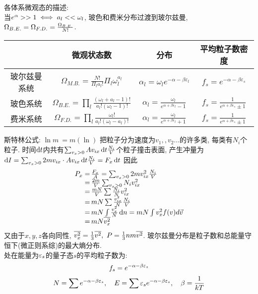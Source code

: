 \documentclass[UTF8,9pt]{ctexart}
\newcommand{\q}[1]{{\color{red} #1}}
\begin{document}
    各体系微观态的描述: \\
    当$e^\alpha>>1 \iff a_l<<\omega_l$, 玻色和费米分布过渡到玻尔兹曼, $\Omega_{B.E.}=\Omega_{F.D.}=\frac{\Omega_{B.E.}}{N!}$.
    \begin{table}[]
        \centering
        \begin{tabular}{|c|c|c|c|}
        \hline
               & 微观状态数                                                                                                     & 分布                                                                 & 平均粒子数密度                                                  \\ \hline
        玻尔兹曼系统 & $\Omega_{M . B .}=\frac{N !}{\Pi_{l} a_{l} !} \Pi_{l} \omega_{l}^{a_{l}}$                                 & $\alpha_{l}=\omega_{l} e^{-\alpha-\beta \varepsilon_{l}}$          & $f_{s}=e^{-\alpha-\beta \varepsilon_{s}}$                \\ \hline
        玻色系统   & $\Omega_{B . E .}=\prod_{l} \frac{\left(\omega_{l}+a_{l}-1\right) !}{a_{l} !\left(\omega_{l}-1\right) !}$ & $\alpha_{l}=\frac{\omega_{l}}{e^{\alpha+\beta \varepsilon_{l}}-1}$ & $f_{s}=\frac{1}{e^{\alpha+\beta \varepsilon_{s}} \pm 1}$ \\ \hline
        费米系统   & $\Omega_{F . D .}=\prod_{l} \frac{\omega_{l} !}{a_l!\left(\omega_{l}-a_{l}\right) !}$                   & $\alpha_{l}=\frac{\omega_{l}}{e^{\alpha+\beta \varepsilon_{l}}+1}$ & $f_{s}=\frac{1}{e^{\alpha+\beta \varepsilon_{s}} \pm 1}$ \\ \hline
        \end{tabular}
        \end{table}
    \q{斯特林公式}: $\ln m~ =m(\ln)$
    把粒子分为速度为$v_1,,v_2...$的许多类, 每类有$N_i$个粒子. 时间$\mathop{}\!\mathrm{d} t$内共有$\sum_{v_x>0} Av_{ix}\mathop{}\!\mathrm{d} t\frac{N_i}{V}$个粒子撞击表面, 产生冲量为$\mathop{}\!\mathrm{d} I=\sum_{v_x>0} 2mv_{ix} \cdot Av_{ix}\mathop{}\!\mathrm{d} t\frac{N_i}{V}=F_x\mathop{}\!\mathrm{d} t$
    因此
    $$\ar{
        P_x\x \f{F_x}{A}=\sum_{v_x>0} 2mv_{ix}^2\f{N_i}{V}\\
        \x \f{2m}{V}\sum_{v_x>0} N_iv_{ix}^2\\
        \x \f{mN}{V}\sum \f{N_i}{N}v_{ix}^2\\
        \x  mN\sum \f{v_{ix}^2}{N}\f{N_i}{V}\\
        \x mN\int \f{v_x^2}{N}\d n=mN\int v_x^2f(v)d\vec{v}\\
        \x mN\bar{v_x^2}
    }$$
    又由于$x,y,z$各向同性, $\bar{v_x^2}=\ff{3}\bar{v^2},\ P=\ff{3}nm\bar{v^2}$.
玻尔兹曼分布是粒子数和总能量守恒下(微正则系综)的最大熵分布.\\
处在能量为$\varepsilon_s$的量子态$s$的平均粒子数为:
$$f_s=e^{-\alpha-\beta\varepsilon_s}$$
$$N=\sum e^{-\alpha-\beta\varepsilon_s}, \quad E=\sum \varepsilon_s e^{-\alpha-\beta\varepsilon_s}, \quad \beta=\frac{1}{kT}$$
\end{document}

